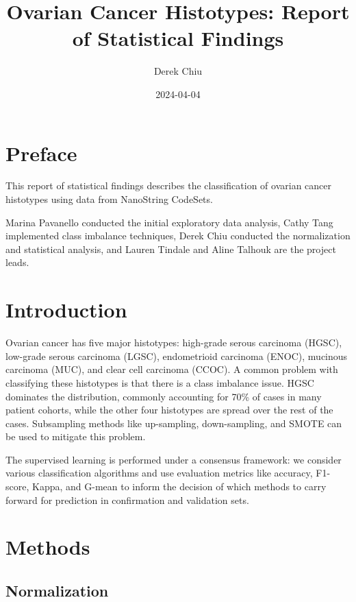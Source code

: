 \documentclass[
]{report}
\title{Ovarian Cancer Histotypes: Report of Statistical Findings}
\author{Derek Chiu}
\date{2024-04-04}
\begin{document}
\maketitle

{
\hypersetup{linkcolor=}
\setcounter{tocdepth}{1}
\tableofcontents
}
\listoffigures
\listoftables
\hypertarget{preface}{%
\chapter*{Preface}\label{preface}}

This report of statistical findings describes the classification of ovarian cancer histotypes using data from NanoString CodeSets.

Marina Pavanello conducted the initial exploratory data analysis, Cathy Tang implemented class imbalance techniques, Derek Chiu conducted the normalization and statistical analysis, and Lauren Tindale and Aline Talhouk are the project leads.

\hypertarget{introduction}{%
\chapter{Introduction}\label{introduction}}

Ovarian cancer has five major histotypes: high-grade serous carcinoma (HGSC), low-grade serous carcinoma (LGSC), endometrioid carcinoma (ENOC), mucinous carcinoma (MUC), and clear cell carcinoma (CCOC). A common problem with classifying these histotypes is that there is a class imbalance issue. HGSC dominates the distribution, commonly accounting for 70\% of cases in many patient cohorts, while the other four histotypes are spread over the rest of the cases. Subsampling methods like up-sampling, down-sampling, and SMOTE can be used to mitigate this problem.

The supervised learning is performed under a consensus framework: we consider various classification algorithms and use evaluation metrics like accuracy, F1-score, Kappa, and G-mean to inform the decision of which methods to carry forward for prediction in confirmation and validation sets.

\hypertarget{methods}{%
\chapter{Methods}\label{methods}}

\hypertarget{normalization}{%
\section{Normalization}\label{normalization}}
\end{document}
